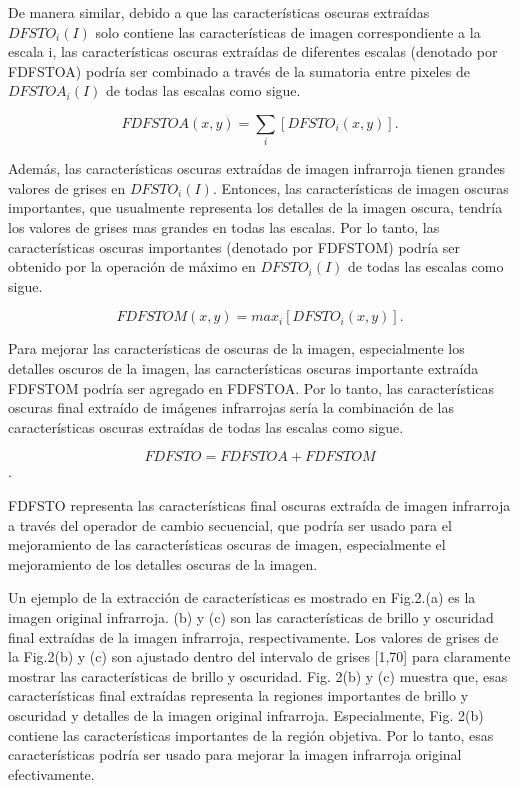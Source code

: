 \documentclass[a4paper, 11 pt, conference]{ieeeconf}      %
\begin{document}
De manera similar, debido a que las caracter\'isticas oscuras extra\'idas  $DFSTO_i(I)$ solo contiene las caracter\'isticas de imagen correspondiente a la escala i, las caracter\'isticas oscuras extra\'idas de diferentes escalas (denotado por FDFSTOA) podr\'ia ser combinado a trav\'es de la sumatoria entre pixeles de $DFSTOA_i(I)$ de todas las escalas como sigue.

$$
FDFSTOA(x,y) = \sum_{i} [DFSTO_i(x,y)].
$$

Adem\'as, las caracter\'isticas oscuras extra\'idas de imagen infrarroja tienen grandes valores de grises en $DFSTO_i(I)$. Entonces, las caracter\'isticas de imagen oscuras importantes, que usualmente representa los detalles de la imagen oscura, tendr\'ia los valores de grises mas grandes en todas las escalas. Por lo tanto, las caracter\'isticas oscuras importantes (denotado por FDFSTOM) podr\'ia ser obtenido por la operaci\'on de m\'aximo en $DFSTO_i(I)$ de todas las escalas como sigue.

$$
FDFSTOM(x,y) = max_i[DFSTO_i(x,y)].
$$

Para mejorar las caracter\'isticas de oscuras de la imagen, especialmente los detalles oscuros de la imagen, las caracter\'isticas oscuras importante extra\'ida FDFSTOM podr\'ia ser agregado en FDFSTOA. Por lo tanto, las caracter\'isticas oscuras final extra\'ido de im\'agenes infrarrojas ser\'ia la combinaci\'on de las caracter\'isticas oscuras extra\'idas de todas las escalas como sigue.

$$FDFSTO = FDFSTOA + FDFSTOM$$.

FDFSTO representa las caracter\'isticas final oscuras extra\'ida de imagen infrarroja a trav\'es del operador de cambio secuencial, que podr\'ia ser usado para el mejoramiento de las caracter\'isticas oscuras de imagen, especialmente el mejoramiento de los detalles oscuras de la imagen.

Un ejemplo de la extracci\'on de caracter\'isticas es mostrado en Fig.2.(a) es la imagen original infrarroja. (b) y (c) son las caracter\'isticas de brillo y oscuridad final extra\'idas de la imagen infrarroja, respectivamente. Los valores de grises de la Fig.2(b) y (c) son ajustado dentro del intervalo de grises [1,70] para claramente mostrar las caracter\'isticas de brillo y oscuridad. Fig. 2(b) y (c) muestra que, esas caracter\'isticas final extra\'idas representa la regiones importantes de brillo y oscuridad y detalles de la imagen original infrarroja.
Especialmente, Fig. 2(b) contiene las caracter\'isticas importantes de la regi\'on objetiva. Por lo tanto, esas caracter\'isticas podr\'ia ser usado para mejorar la imagen infrarroja original efectivamente.
\end{document}
